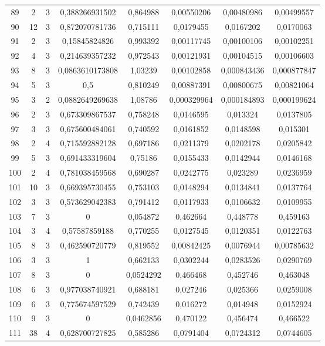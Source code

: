 \begin{longtable}{|c|c|c|c|c|c|c|c|}
89 & 2 & 3 & 0,388266931502 & 0,864988 & 0,00550206 & 0,00480986 & 0,00499557  \\
90 & 12 & 3 & 0,872070781736 & 0,715111 & 0,0179455 & 0,0167202 & 0,0170063  \\
91 & 2 & 3 & 0,15845824826 & 0,993392 & 0,00117745 & 0,00100106 & 0,00102251  \\
92 & 4 & 3 & 0,214639357232 & 0,972543 & 0,00121931 & 0,00104515 & 0,00106603  \\
93 & 8 & 3 & 0,0863610173808 & 1,03239 & 0,00102858 & 0,000843436 & 0,000877847  \\
94 & 5 & 3 & 0,5 & 0,810249 & 0,00887391 & 0,00800675 & 0,00821064  \\
95 & 3 & 2 & 0,0882649269638 & 1,08786 & 0,000329964 & 0,000184893 & 0,000199624  \\
96 & 2 & 3 & 0,673309867537 & 0,758248 & 0,0146595 & 0,013324 & 0,0137805  \\
97 & 3 & 3 & 0,675600484061 & 0,740592 & 0,0161852 & 0,0148598 & 0,015301  \\
98 & 2 & 4 & 0,715592882128 & 0,697186 & 0,0211379 & 0,0202178 & 0,0205842  \\
99 & 5 & 3 & 0,691433319604 & 0,75186 & 0,0155433 & 0,0142944 & 0,0146168  \\
100 & 2 & 4 & 0,781038459568 & 0,690287 & 0,0242775 & 0,023289 & 0,0236959  \\
101 & 10 & 3 & 0,669395730455 & 0,753103 & 0,0148294 & 0,0134841 & 0,0137764  \\
102 & 3 & 3 & 0,573629042383 & 0,791412 & 0,0117933 & 0,0106632 & 0,0109955  \\
103 & 7 & 3 & 0 & 0,054872 & 0,462664 & 0,448778 & 0,459163  \\
104 & 3 & 4 & 0,57587859188 & 0,770255 & 0,0127545 & 0,0120351 & 0,0122763  \\
105 & 8 & 3 & 0,462590720779 & 0,819552 & 0,00842425 & 0,0076944 & 0,00785632  \\
106 & 3 & 3 & 1 & 0,662133 & 0,0302244 & 0,0283526 & 0,0290769  \\
107 & 8 & 3 & 0 & 0,0524292 & 0,466468 & 0,452746 & 0,463048  \\
108 & 6 & 3 & 0,977038740921 & 0,688181 & 0,027246 & 0,025366 & 0,0259008  \\
109 & 6 & 3 & 0,775674597529 & 0,742439 & 0,016272 & 0,014948 & 0,0152924  \\
110 & 9 & 3 & 0 & 0,0462856 & 0,470122 & 0,456474 & 0,466522  \\
111 & 38 & 4 & 0,628700727825 & 0,585286 & 0,0791404 & 0,0724312 & 0,0744605  \\

\end{longtable}

